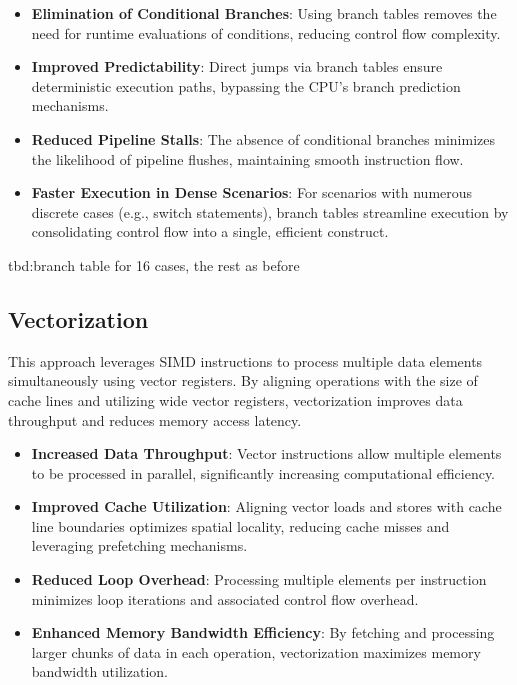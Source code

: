 \documentclass{article}
\begin{document}
\begin{itemize}
  \item \textbf{Elimination of Conditional Branches}: Using branch tables removes the need for runtime evaluations of conditions, reducing control flow complexity.
  \item \textbf{Improved Predictability}: Direct jumps via branch tables ensure deterministic execution paths, bypassing the CPU's branch prediction mechanisms.
  \item \textbf{Reduced Pipeline Stalls}: The absence of conditional branches minimizes the likelihood of pipeline flushes, maintaining smooth instruction flow.
  \item \textbf{Faster Execution in Dense Scenarios}: For scenarios with numerous discrete cases (e.g., switch statements), branch tables streamline execution by consolidating control flow into a single, efficient construct.
\end{itemize}

tbd:branch table for 16 cases, the rest as before

\subsection{Vectorization}

This approach leverages SIMD instructions to process multiple data elements simultaneously using vector registers. By aligning operations with the size of cache lines and utilizing wide vector registers, vectorization improves data throughput and reduces memory access latency.

\begin{itemize}
  \item \textbf{Increased Data Throughput}: Vector instructions allow multiple elements to be processed in parallel, significantly increasing computational efficiency.
  \item \textbf{Improved Cache Utilization}: Aligning vector loads and stores with cache line boundaries optimizes spatial locality, reducing cache misses and leveraging prefetching mechanisms.
  \item \textbf{Reduced Loop Overhead}: Processing multiple elements per instruction minimizes loop iterations and associated control flow overhead.
  \item \textbf{Enhanced Memory Bandwidth Efficiency}: By fetching and processing larger chunks of data in each operation, vectorization maximizes memory bandwidth utilization.
\end{itemize}
\end{document}
